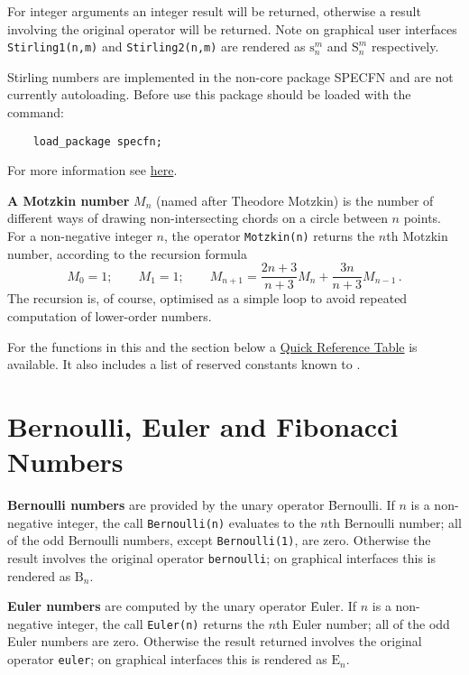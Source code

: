 For integer arguments an integer result will be
returned, otherwise a result involving the original operator will be returned.
Note on graphical user interfaces \texttt{Stirling1(n,m)} and
\texttt{Stirling2(n,m)} are rendered as
$\mathrm{s}_n^m$ and $\mathrm{S}_n^m$ respectively.

Stirling numbers are implemented in the non-core package SPECFN and are
not currently autoloading. Before use this package should be loaded with the
command:
\begin{verbatim}
    load_package specfn;
\end{verbatim}
For more information see \hyperlink{STIRL}{here}.

\hypertarget{operator:MOTZKIN}{}
\textbf{A Motzkin number} $M_{n}$ (named after Theodore Motzkin) is the
number of different ways of drawing non-intersecting chords on a circle between
$n$ points. For a non-negative integer $n$, the operator \texttt{Motzkin(n)}
returns the $n$th Motzkin number, according to the recursion formula
\[
  M_{0} = 1; \qquad M_{1}=1; \qquad
  M_{n+1} = \frac{2n+3}{n+3}M_{n}+ \frac{3n}{n+3}M_{n-1}\,.
\]
The recursion is, of course, optimised as a simple loop to avoid repeated
computation of lower-order numbers.

For the functions in this and the section below
a \hyperlink{SPECFNTAB5}{Quick Reference Table} is available.
It also includes a list of reserved constants known to {\REDUCE}.

\section{Bernoulli, Euler and Fibonacci Numbers}
\hypertarget{operator:BERNOULLI}{}
\textbf{Bernoulli numbers} are provided by the unary operator
\f{Bernoulli}. If $n$ is a non-negative integer, the call \texttt{Bernoulli(n)}
evaluates to the $n$th Bernoulli number; all of the odd Bernoulli numbers,
except \texttt{Bernoulli(1)}, are zero. Otherwise the result involves the
original operator \texttt{bernoulli}; on graphical interfaces this is rendered
as $\mathrm{B}_n$.

\hypertarget{operator:EULER}{}
\textbf{Euler numbers} are computed by the unary operator \f{Euler}.  If $n$
is a non-negative integer, the call \texttt{Euler(n)} returns the $n$th
Euler number; all of the odd Euler numbers are zero.
Otherwise the result returned involves the original operator \texttt{euler};
on graphical interfaces this is rendered
as $\mathrm{E}_n$.

